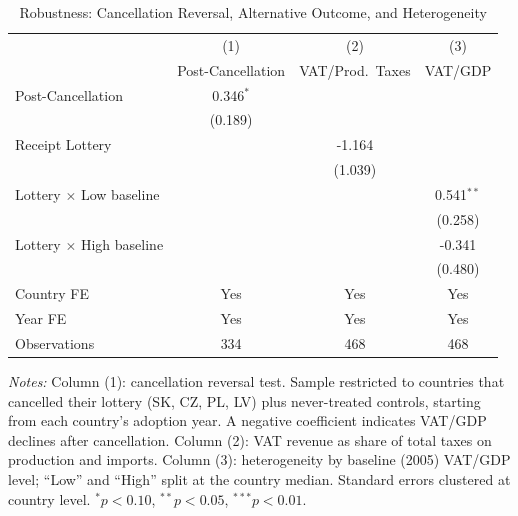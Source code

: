 \begin{table}[t]
\centering
\caption{Robustness: Cancellation Reversal, Alternative Outcome, and Heterogeneity}
\label{tab:robustness}
\begin{tabular}{lccc}
\toprule
 & (1) & (2) & (3) \\
 & Post-Cancellation & VAT/Prod.\ Taxes & VAT/GDP \\
\midrule
Post-Cancellation & 0.346$^{*}$ & & \\
 & (0.189) & & \\
Receipt Lottery & & -1.164 & \\
 & & (1.039) & \\
Lottery $\times$ Low baseline & & & 0.541$^{**}$ \\
 & & & (0.258) \\
Lottery $\times$ High baseline & & & -0.341 \\
 & & & (0.480) \\
\midrule
Country FE & Yes & Yes & Yes \\
Year FE & Yes & Yes & Yes \\
Observations & 334 & 468 & 468 \\
\bottomrule
\end{tabular}
\begin{tablenotes}
\small
\item \textit{Notes:} Column (1): cancellation reversal test. Sample restricted to countries that cancelled their lottery (SK, CZ, PL, LV) plus never-treated controls, starting from each country's adoption year. A negative coefficient indicates VAT/GDP declines after cancellation. Column (2): VAT revenue as share of total taxes on production and imports. Column (3): heterogeneity by baseline (2005) VAT/GDP level; ``Low'' and ``High'' split at the country median. Standard errors clustered at country level. $^{*}p<0.10$, $^{**}p<0.05$, $^{***}p<0.01$.
\end{tablenotes}
\end{table}
